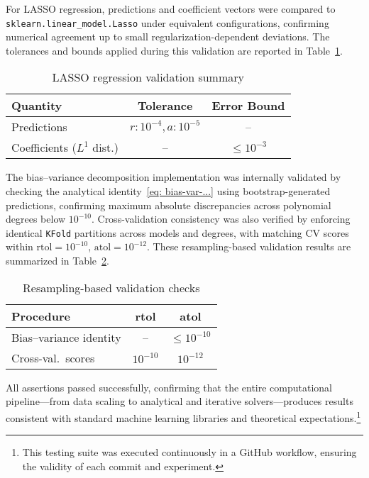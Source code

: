 \documentclass[
    article
 reprint,            %
 amsmath,amssymb,
 aps,
]{revtex4-2}
\begin{document}
For LASSO regression, predictions and coefficient vectors were compared to \texttt{sklearn.linear\_model.Lasso} under equivalent configurations, confirming numerical agreement up to small regularization-dependent deviations. 
The tolerances and bounds applied during this validation are reported in Table~\ref{tab:lasso_validation}.

\begin{table}[H]
\centering
\small
\setlength{\tabcolsep}{3pt}
\caption{LASSO regression validation summary}
\label{tab:lasso_validation}
\begin{tabular}{lcc}
\toprule
\textbf{Quantity} & \textbf{Tolerance} & \textbf{Error Bound} \\
\midrule
Predictions & $r:10^{-4}, a:10^{-5}$ & – \\
Coefficients ($L^1$ dist.) & – & $\le 10^{-3}$ \\
\bottomrule
\end{tabular}
\end{table}

The bias–variance decomposition implementation was internally validated by checking the analytical identity~\ref{eq: bias-var-...} using bootstrap-generated predictions, 
confirming maximum absolute discrepancies across polynomial degrees below $10^{-10}$. 
Cross-validation consistency was also verified by enforcing identical \texttt{KFold} partitions across models and degrees, 
with matching CV scores within \(\text{rtol}=10^{-10}\), \(\text{atol}=10^{-12}\). 
These resampling-based validation results are summarized in Table~\ref{tab:resampling_validation}.

\begin{table}[H]
\centering
\small
\setlength{\tabcolsep}{3pt}
\caption{Resampling-based validation checks}
\label{tab:resampling_validation}
\begin{tabular}{lcc}
\toprule
\textbf{Procedure} & \textbf{rtol} & \textbf{atol} \\
\midrule
Bias–variance identity & – & $\le 10^{-10}$ \\
Cross-val.\ scores & $10^{-10}$ & $10^{-12}$ \\
\bottomrule
\end{tabular}
\end{table}

All assertions passed successfully, confirming that the entire computational pipeline—from data scaling to analytical and iterative solvers—produces results consistent with standard machine learning libraries and theoretical expectations.\footnote{This testing suite was executed continuously in a GitHub workflow, ensuring the validity of each commit and experiment.}
\end{document}
